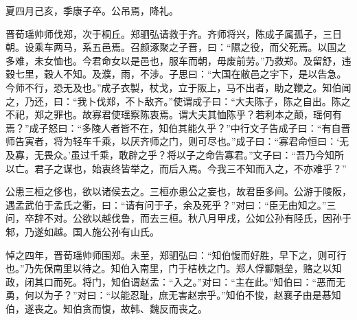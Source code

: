 \documentclass[a4paper,12pt,UTF8,twoside]{ctexbook}
\begin{document}
夏四月己亥，季康子卒。公吊焉，降礼。

晋荀瑶帅师伐郑，次于桐丘。郑驷弘请救于齐。齐师将兴，陈成子属孤子，三日朝。设乘车两马，系五邑焉。召颜涿聚之子晋，曰：“隰之役，而父死焉。以国之多难，未女恤也。今君命女以是邑也，服车而朝，毋废前劳。”乃救郑。及留舒，违穀七里，穀人不知。及濮，雨，不涉。子思曰：“大国在敝邑之宇下，是以告急。今师不行，恐无及也。”成子衣製，杖戈，立于阪上，马不出者，助之鞭之。知伯闻之，乃还，曰：“我卜伐郑，不卜敌齐。”使谓成子曰：“大夫陈子，陈之自出。陈之不祀，郑之罪也。故寡君使瑶察陈衷焉。谓大夫其恤陈乎？若利本之颠，瑶何有焉？”成子怒曰：“多陵人者皆不在，知伯其能久乎？”中行文子告成子曰：“有自晋师告寅者，将为轻车千乘，以厌齐师之门，则可尽也。”成子曰：“寡君命恒曰：‘无及寡，无畏众。’虽过千乘，敢辟之乎？将以子之命告寡君。”文子曰：“吾乃今知所以亡。君子之谋也，始衷终皆举之，而后入焉。今我三不知而入之，不亦难乎？”

公患三桓之侈也，欲以诸侯去之。三桓亦患公之妄也，故君臣多间。公游于陵阪，遇孟武伯于孟氏之衢，曰：“请有问于子，余及死乎？”对曰：“臣无由知之。”三问，卒辞不对。公欲以越伐鲁，而去三桓。秋八月甲戌，公如公孙有陉氏，因孙于邾，乃遂如越。国人施公孙有山氏。

悼之四年，晋荀瑶帅师围郑。未至，郑驷弘曰：“知伯愎而好胜，早下之，则可行也。”乃先保南里以待之。知伯入南里，门于桔柣之门。郑人俘酅魁垒，赂之以知政，闭其口而死。将门，知伯谓赵孟：“入之。”对曰：“主在此。”知伯曰：“恶而无勇，何以为子？”对曰：“以能忍耻，庶无害赵宗乎。”知伯不悛，赵襄子由是惎知伯，遂丧之。知伯贪而愎，故韩、魏反而丧之。


\backmatter
\end{document}
